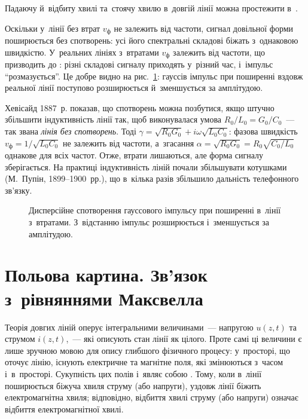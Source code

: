 \begin{Simulation}
Падаючу й~відбиту хвилі та~стоячу хвилю в~довгій лінії можна простежити в~.
\end{Simulation}

Оскільки у~лінії без втрат $v_{\text{ф}}$ не залежить від частоти, сигнал довільної форми поширюється без спотворень: усі його спектральні складові біжать з~однаковою швидкістю. У~реальних лініях з~втратами $v_{\text{ф}}$ залежить від частоти, що призводить до : різні складові сигналу приходять у~різний час, і~імпульс \enquote{розмазується}. Це добре видно на рис.~\ref{fig:pulse_dispersion}: гауссів імпульс при поширенні вздовж реальної лінії поступово розширюється й~зменшується за амплітудою.

Хевісайд 1887~р. показав, що спотворень можна позбутися, якщо штучно збільшити індуктивність лінії так, щоб виконувалася умова $R_0/L_0 = G_0/C_0$~--- так звана \emph{лінія без спотворень}. Тоді $\gamma=\sqrt{R_0G_0}+i\omega\sqrt{L_0C_0}$: фазова швидкість $v_{\text{ф}}=1/\sqrt{L_0C_0}$ не залежить від частоти, а~згасання $\alpha=\sqrt{R_0G_0}=R_0\sqrt{C_0/L_0}$ однакове для всіх частот. Отже, втрати лишаються, але форма сигналу зберігається. На практиці індуктивність ліній почали збільшувати котушками (М.~Пупін, 1899--1900~рр.), що в~кілька разів збільшило дальність телефонного зв'язку.

\begin{figure}[h!]
	\centering
	\caption{Дисперсійне спотворення гауссового імпульсу при поширенні в~лінії з~втратами. З~відстанню імпульс розширюється і~зменшується за амплітудою.}
	\label{fig:pulse_dispersion}
\end{figure}

\section{Польова картина. Зв'язок з~рівняннями Максвелла}\hypertarget{field-picture-maxwell}{}

Теорія довгих ліній оперує інтегральними величинами~--- напругою $u(z,t)$ та струмом $i(z,t)$,~--- які описують стан лінії як цілого. Проте самі ці величини є лише зручною мовою для опису глибшого фізичного процесу: у~просторі, що оточує лінію, існують електричне та магнітне поля, які змінюються з~часом і~в~просторі. Сукупність цих полів і~являє собою . Тому, коли в~лінії поширюється біжуча хвиля струму (або напруги), уздовж лінії біжить електромагнітна хвиля; відповідно, відбиття хвилі струму (або напруги) означає відбиття електромагнітної хвилі.

